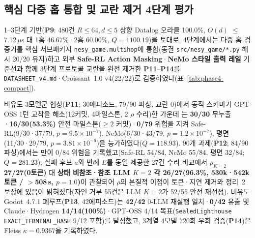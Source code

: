 \subsection{핵심 다중 홉 통합 및 교란 제거 4단계 평가}\label{sec:phase4-compact}
1--3단계 기반(\textbf{P9}: 480건 $R{\le}64, d{\le}5$ 상향 Datalog 오라클 100.0\%, $O(d)$ $\le$7.12\,$\mu$s 대 1홉 46.67\%·2홉 60.00\%, $Q{=}1100.19$)을 토대로, 4단계에서는 다중 홉 검증기를 핵심 서브패키지 \texttt{nesy\_game.multihop}에 통합(동결 \texttt{src/nesy\_game/*.py} 해시 20/20 유지)하고 외부 \textbf{Safe-RL Action Masking}·\textbf{NeMo 스타일 출력 레일} 기준선과 함께 3단계 프로토콜 교란을 완전 제거한 \textbf{P11}--\textbf{P14}를 \texttt{DATASHEET\_v4.md}·Croissant~1.0 v4(22/22)로 검증하였다(표~\ref{tab:phase4-compact}).

비유도 3모델군 협상(\textbf{P11}; 30에피소드, 79/90 파싱, 교란 0)에서 동적 스키마가 GPT-OSS 1턴 교착을 해소(12커밋, 4마일스톤, 2 $\rho$ 수리)한 가운데 \system{}는 \textbf{30/30} 무누출·\textbf{16/30(53.3\%)} 안전 마일스톤(${\ge}2$ 커밋)·\textbf{0/79} 위험을 지켜 Safe-RL(9/30·37/79, $p{=}9.5{\times}10^{-7}$), NeMo(6/30·43/79, $p{=}1.2{\times}10^{-7}$), 평면(11/30·29/79, $p{=}3.81{\times}10^{-6}$)을 능가하였다($Q{=}118.93$). 90개 과제(\textbf{P12}; 84/90 파싱)에서는 \system{}만이 0/84 위험을 기록했고(Safe-RL 54/84, NeMo 55/84, 평면 32/84; $Q{=}281.23$), 실패 후보 $a$와 반례 $E$를 동일 제공한 27건 수리 비교에서 \textbf{$\rho_{K=2}$ 27/27(0토큰)} 대 \textbf{상태 비참조·참조 LLM $K{=}2$ 각 26/27(96.3\%, 530k·542k토큰 / $>$508\,s, $p{=}1.0$)}이 관찰되어 $\rho$의 본질적 이점이 토큰·지연 제거와 정리~2 보장에 있음이 밝혀졌다(자연 거부 55건은 LLM $K{=}2$가 52/55 안전 재선정). 비유도 Godot~4.7.1 폐루프(\textbf{P13}, 42에피소드)는 \textbf{42/42} 0-LLM 재실행 일치·\textbf{0/42} 유출 및 Claude·Hydrogen \textbf{14/14(100\%)}·GPT-OSS 4/14 목표(\texttt{SealedLighthouse} \texttt{EXACT\_TERMINAL\_HASH} 9/12 포함)를 달성했고, 3계열 4모델 720회 우회 검증(\textbf{P14})은 Fleiss $\kappa{=}\mathbf{0.9367}$을 기록하였다.


